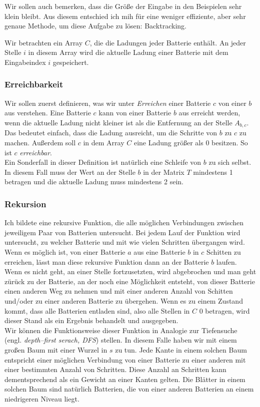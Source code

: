 \documentclass[a4paper,10pt,ngerman]{scrartcl}
\begin{document}
Wir sollen auch bemerken, dass die Größe der Eingabe in den Beispielen sehr klein bleibt. Aus diesem entschied ich mih
für eine weniger effiziente, aber sehr genaue Methode, um diese Aufgabe zu lösen: Backtracking. 

Wir betrachten ein Array $C$, die die Ladungen jeder Batterie enthält. An jeder Stelle $i$ in diesem Array wird die aktuelle
Ladung einer Batterie mit dem Eingabeindex $i$ gespeichert.

\subsubsection{Erreichbarkeit}
Wir sollen zuerst definieren, was wir unter \textit{Erreichen} einer Batterie $c$ von einer $b$ aus verstehen.
Eine Batterie $c$ kann von einer Batterie $b$ aus erreicht werden, wenn die aktuelle Ladung nicht kleiner ist als die Entfernung 
an der Stelle $A_{b,c}$. Das bedeutet einfach, dass die Ladung ausreicht, um die Schritte von $b$ zu $c$ zu machen.
Außerdem soll $c$ in dem Array $C$ eine Ladung größer als 0 besitzen. So ist $c$ \textit{erreichbar}.\\
Ein Sonderfall in dieser Definition ist natürlich eine Schleife von $b$ zu sich selbst. 
In diesem Fall muss der Wert an der Stelle $b$ in der Matrix $T$ mindestens 1 betragen und die aktuelle Ladung muss
mindestens 2 sein.

\subsubsection{Rekursion}
Ich bildete eine rekursive Funktion, die alle möglichen Verbindungen zwischen jeweiligem Paar von Batterien untersucht.
Bei jedem Lauf der Funktion wird untersucht, zu welcher Batterie und mit wie vielen Schritten übergangen wird.\\
Wenn es möglich ist, von einer Batterie $a$ aus eine Batterie $b$ in $c$ Schitten zu erreichen, lässt man diese rekursive
Funktion dann an der Batterie $b$ laufen. Wenn es nicht geht, an einer Stelle fortzusetzten, wird abgebrochen
und man geht zürück zu der Batterie, an der noch eine Möglichkeit entsteht, von dieser Batterie einen anderen Weg zu nehmen
und mit einer anderen Anzahl von Schitten und/oder zu einer anderen Batterie zu übergehen. Wenn es zu einem Zustand kommt, dass alle
Batterien entladen sind, also alle Stellen in $C$ 0 betragen, wird dieser Stand als ein Ergebnis behandelt und ausgegeben.\\

Wir können die Funktionsweise dieser Funktion in Analogie zur Tiefensuche (engl. \textit{depth--first serach, DFS}) stellen.
In diesem Falle haben wir mit einem großen Baum mit einer Wurzel in $s$ zu tun.
Jede Kante in einem solchen Baum entspricht einer möglichen
Verbindung von einer Batterie zu einer anderen mit einer bestimmten Anzahl von Schritten.
Diese Anzahl an Schritten kann dementsprechend als ein Gewicht an einer Kanten gelten.
Die Blätter in einem solchen Baum sind natürlich Batterien, die von einer anderen Batterien an einem niedrigeren Niveau liegt.\\
\end{document}
